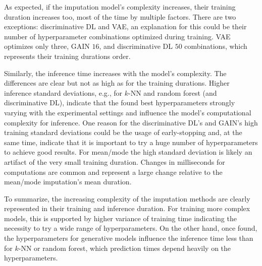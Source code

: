 As expected, if the imputation model's complexity increases, their training duration increases too, most of the time by multiple factors. There are two exceptions: discriminative DL and VAE, an explanation for this could be their number of hyperparameter combinations optimized during training. VAE optimizes only three, GAIN $16$, and discriminative DL $50$ combinations, which represents their training durations order.

Similarly, the inference time increases with the model's complexity. The differences are clear but not as high as for the training durations.
Higher inference standard deviations, e.g., for $k$-NN and random forest (and discriminative DL), indicate that the found best hyperparameters strongly varying with the experimental settings and influence the model's computational complexity for inference. One reason for the discriminative DL's and GAIN's high training standard deviations could be the usage of early-stopping and, at the same time, indicate that it is important to try a huge number of hyperparameters to achieve good results. For mean/mode the high standard deviation is likely an artifact of the very small training duration. Changes in milliseconds for computations are common and represent a large change relative to the mean/mode imputation's mean duration.

To summarize, the increasing complexity of the imputation methods are clearly represented in their training and inference duration. For training more complex models, this is supported by higher variance of training time indicating the necessity to try a wide range of hyperparameters. On the other hand, once found, the hyperparameters  for generative models influence the inference time less than for $k$-NN or random forest, which prediction times depend heavily on the hyperparameters.
